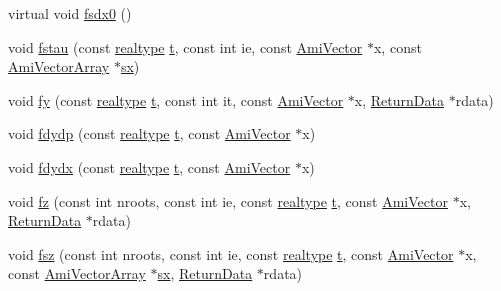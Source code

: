 \begin{DoxyCompactItemize}
\item 
virtual void \mbox{\hyperlink{classamici_1_1_model_a946b60982bd7321bcc2bdae10ea8358f}{fsdx0}} ()
\item 
void \mbox{\hyperlink{classamici_1_1_model_a382cd2049c70f0dd4aafe483e4a50cff}{fstau}} (const \mbox{\hyperlink{namespaceamici_a1bdce28051d6a53868f7ccbf5f2c14a3}{realtype}} \mbox{\hyperlink{classamici_1_1_model_a711281d57e9710226face29151cc4641}{t}}, const int ie, const \mbox{\hyperlink{classamici_1_1_ami_vector}{Ami\+Vector}} $\ast$x, const \mbox{\hyperlink{classamici_1_1_ami_vector_array}{Ami\+Vector\+Array}} $\ast$\mbox{\hyperlink{classamici_1_1_model_ac3288cc7f649605938f1fd1b459d3d8c}{sx}})
\item 
void \mbox{\hyperlink{classamici_1_1_model_a71266639a3e366b6ceff4358559ecb5c}{fy}} (const \mbox{\hyperlink{namespaceamici_a1bdce28051d6a53868f7ccbf5f2c14a3}{realtype}} \mbox{\hyperlink{classamici_1_1_model_a711281d57e9710226face29151cc4641}{t}}, const int it, const \mbox{\hyperlink{classamici_1_1_ami_vector}{Ami\+Vector}} $\ast$x, \mbox{\hyperlink{classamici_1_1_return_data}{Return\+Data}} $\ast$rdata)
\item 
void \mbox{\hyperlink{classamici_1_1_model_a322eb75785aa46abe19813b9c56d706e}{fdydp}} (const \mbox{\hyperlink{namespaceamici_a1bdce28051d6a53868f7ccbf5f2c14a3}{realtype}} \mbox{\hyperlink{classamici_1_1_model_a711281d57e9710226face29151cc4641}{t}}, const \mbox{\hyperlink{classamici_1_1_ami_vector}{Ami\+Vector}} $\ast$x)
\item 
void \mbox{\hyperlink{classamici_1_1_model_ac60c960da1c933254a92bb9b681e9426}{fdydx}} (const \mbox{\hyperlink{namespaceamici_a1bdce28051d6a53868f7ccbf5f2c14a3}{realtype}} \mbox{\hyperlink{classamici_1_1_model_a711281d57e9710226face29151cc4641}{t}}, const \mbox{\hyperlink{classamici_1_1_ami_vector}{Ami\+Vector}} $\ast$x)
\item 
void \mbox{\hyperlink{classamici_1_1_model_a34f0ec7e922c0817b08d0021dba9c36f}{fz}} (const int nroots, const int ie, const \mbox{\hyperlink{namespaceamici_a1bdce28051d6a53868f7ccbf5f2c14a3}{realtype}} \mbox{\hyperlink{classamici_1_1_model_a711281d57e9710226face29151cc4641}{t}}, const \mbox{\hyperlink{classamici_1_1_ami_vector}{Ami\+Vector}} $\ast$x, \mbox{\hyperlink{classamici_1_1_return_data}{Return\+Data}} $\ast$rdata)
\item 
void \mbox{\hyperlink{classamici_1_1_model_ae977a1364eb91b11b7a1f6f63c0c4547}{fsz}} (const int nroots, const int ie, const \mbox{\hyperlink{namespaceamici_a1bdce28051d6a53868f7ccbf5f2c14a3}{realtype}} \mbox{\hyperlink{classamici_1_1_model_a711281d57e9710226face29151cc4641}{t}}, const \mbox{\hyperlink{classamici_1_1_ami_vector}{Ami\+Vector}} $\ast$x, const \mbox{\hyperlink{classamici_1_1_ami_vector_array}{Ami\+Vector\+Array}} $\ast$\mbox{\hyperlink{classamici_1_1_model_ac3288cc7f649605938f1fd1b459d3d8c}{sx}}, \mbox{\hyperlink{classamici_1_1_return_data}{Return\+Data}} $\ast$rdata)

\end{DoxyCompactItemize}
